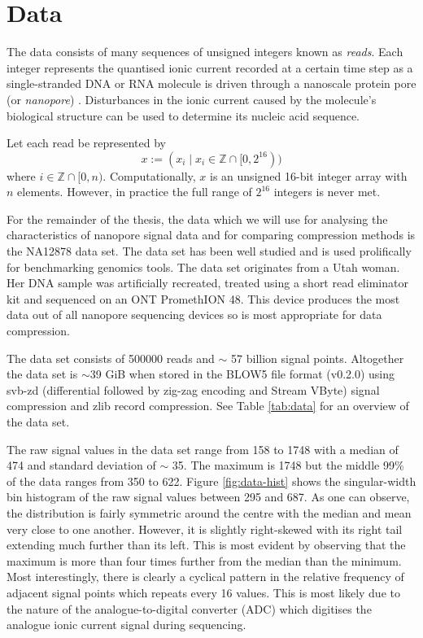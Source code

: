 \chapter{Data} \label{chap:data}

The data consists of many sequences of unsigned integers known as \textit{reads}. Each integer represents the quantised ionic current recorded at a certain time step as a single-stranded DNA or RNA molecule is driven through a nanoscale protein pore (or \textit{nanopore}) \cite{Wang2021}. Disturbances in the ionic current caused by the molecule's biological structure can be used to determine its nucleic acid sequence.

Let each read be represented by
\[ x := (x_i\mid x_i \in \mathbb{Z} \cap [0, 2^{16})) \]
where $i\in \mathbb{Z}\cap [0, n)$. Computationally, $x$ is an unsigned 16-bit integer array with $n$ elements. However, in practice the full range of $2^{16}$ integers is never met.

For the remainder of the thesis, the data which we will use for analysing the characteristics of nanopore signal data and for comparing compression methods is the NA12878 data set. The data set has been well studied and is used prolifically for benchmarking genomics tools. The data set originates from a Utah woman. Her DNA sample was artificially recreated, treated using a short read eliminator kit and sequenced on an ONT PromethION 48. This device produces the most data out of all nanopore sequencing devices so is most appropriate for data compression.

The data set consists of \num{500000} reads and $\sim$ 57 billion signal points. Altogether the data set is $\sim$39 GiB when stored in the BLOW5 file format (v0.2.0) using svb-zd (differential followed by zig-zag encoding and Stream VByte) signal compression and zlib record compression. See Table \ref{tab:data} for an overview of the data set.



The raw signal values in the data set range from 158 to 1748 with a median of 474 and standard deviation of $\sim$ 35. The maximum is 1748 but the middle 99\% of the data ranges from 350 to 622. Figure \ref{fig:data-hist} shows the singular-width bin histogram of the raw signal values between 295 and 687.
As one can observe, the distribution is fairly symmetric around the centre with the median and mean very close to one another. However, it is slightly right-skewed with its right tail extending much further than its left. This is most evident by observing that the maximum is more than four times further from the median than the minimum.
Most interestingly, there is clearly a cyclical pattern in the relative frequency of adjacent signal points which repeats every 16 values.
This is most likely due to the nature of the analogue-to-digital converter (ADC) which digitises the analogue ionic current signal during sequencing.

